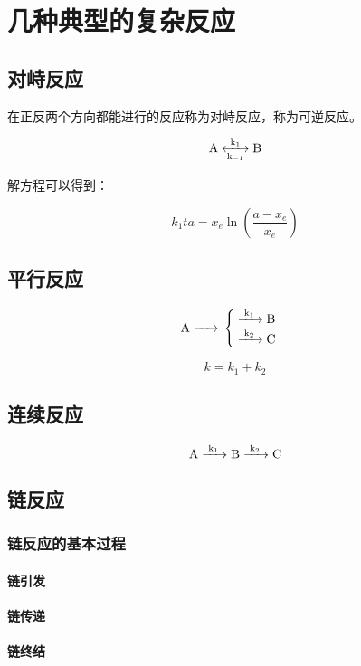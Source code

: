 \section{几种典型的复杂反应}

\subsection{对峙反应}

在正反两个方向都能进行的反应称为对峙反应，称为可逆反应。

\begin{equation*}
    \ce{A <->[k_1][k_{-1}] B}
\end{equation*}

解方程可以得到：

\begin{equation*}
    k_1 ta = x_e \ln \left(\frac{a - x_e}{x_e} \right)
\end{equation*}

\subsection{平行反应}

\begin{equation*}
    \ce{A -> } \begin{cases}
        \ce{->[k_1] B} \\
        \ce{->[k_2] C} \\
    \end{cases}
\end{equation*}

\begin{equation*}
    k = k_1 + k_2
\end{equation*}

\subsection{连续反应}

\begin{equation*}
    \ce{A ->[k_1] B ->[k_2] C}
\end{equation*}



\subsection{链反应}

\subsubsection{链反应的基本过程}

\paragraph{链引发}

\paragraph{链传递}

\paragraph{链终结}

